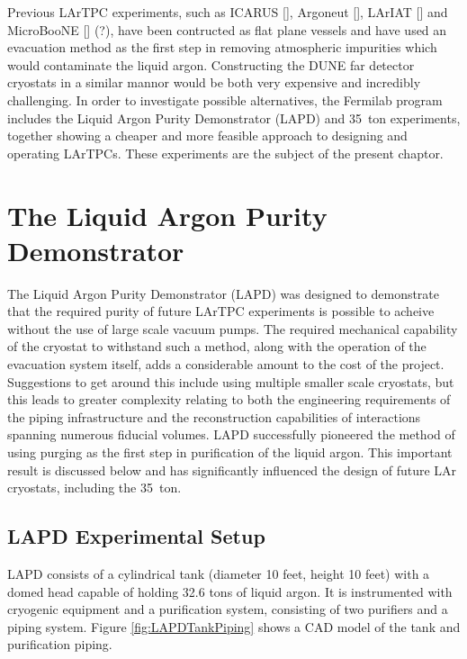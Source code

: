 Previous LArTPC experiments, such as ICARUS [], Argoneut [], LArIAT [] and MicroBooNE [] (?), have been contructed as flat plane vessels and have used an evacuation method as the first step in removing atmospheric impurities which would contaminate the liquid argon.  Constructing the DUNE far detector cryostats in a similar mannor would be both very expensive and incredibly challenging.  In order to investigate possible alternatives, the Fermilab program includes the Liquid Argon Purity Demonstrator (LAPD) and 35~ton experiments, together showing a cheaper and more feasible approach to designing and operating LArTPCs.  These experiments are the subject of the present chaptor.

\section{The Liquid Argon Purity Demonstrator}\label{sec:LAPD}

The Liquid Argon Purity Demonstrator (LAPD) \cite{LAPD} was designed to demonstrate that the required purity of future LArTPC experiments is possible to acheive without the use of large scale vacuum pumps.  The required mechanical capability of the cryostat to withstand such a method, along with the operation of the evacuation system itself, adds a considerable amount to the cost of the project.  Suggestions to get around this include using multiple smaller scale cryostats, but this leads to greater complexity relating to both the engineering requirements of the piping infrastructure and the reconstruction capabilities of interactions spanning numerous fiducial volumes.  LAPD successfully pioneered the method of using purging as the first step in purification of the liquid argon.  This important result is discussed below and has significantly influenced the design of future LAr cryostats, including the 35~ton.

\subsection{LAPD Experimental Setup}\label{sec:LAPDExperimentalSetup}

LAPD consists of a cylindrical tank (diameter 10 feet, height 10 feet) with a domed head capable of holding 32.6 tons of liquid argon.  It is instrumented with cryogenic equipment and a purification system, consisting of two purifiers and a piping system.  Figure \ref{fig:LAPDTankPiping} shows a CAD model of the tank and purification piping.

